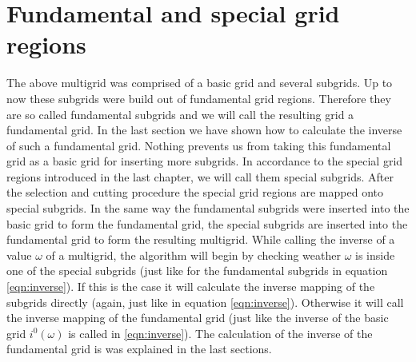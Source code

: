 \section{Fundamental and special grid regions}\label{sec:fundamental_and_special_grid_regions_2}
The above multigrid was comprised of a basic grid and several subgrids. Up to now these subgrids were build out of fundamental grid regions. Therefore they are so called fundamental subgrids and we will call the resulting grid a fundamental grid. In the last section we have shown how to calculate the inverse of such a fundamental grid. Nothing prevents us from taking this fundamental grid as a basic grid for inserting more subgrids. In accordance to the special grid regions introduced in the last chapter, we will call them special subgrids. After the selection and cutting procedure the special grid regions are mapped onto special subgrids. In the same way the fundamental subgrids were inserted into the basic grid to form the fundamental grid, the special subgrids are inserted into the fundamental grid to form the resulting multigrid. While calling the inverse of a value $\omega$ of a multigrid, the algorithm  will begin by checking weather $\omega$ is inside one of the special subgrids (just like for the fundamental subgrids in equation \ref{eqn:inverse}). If this is the case it will calculate the inverse mapping of the subgrids directly (again, just like in equation \ref{eqn:inverse}). Otherwise it will call the inverse mapping of the fundamental grid (just like the inverse of the basic grid $i^0(\omega)$ is called in \ref{eqn:inverse}). The calculation of the inverse of the fundamental grid is was explained in the last sections.



